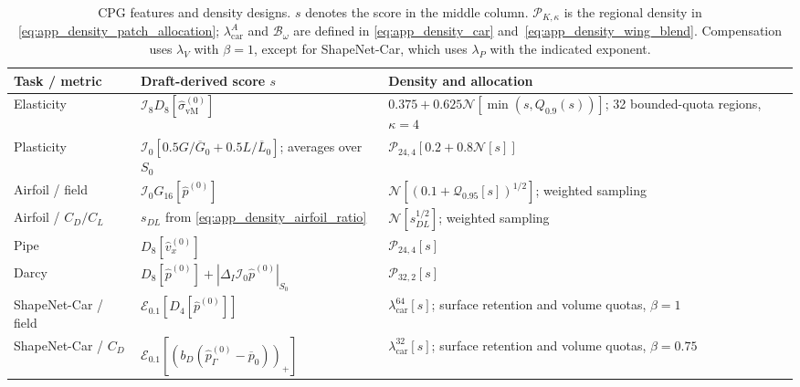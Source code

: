\begin{table}[!htbp]
    \centering
    \small
    \caption{CPG features and density designs. $s$ denotes the score in the middle column. $\mathcal{P}_{K,\kappa}$ is the regional density in \eqref{eq:app_density_patch_allocation}; $\lambda_{\mathrm{car}}^A$ and $\mathcal{B}_\omega$ are defined in \eqref{eq:app_density_car} and~\eqref{eq:app_density_wing_blend}. Compensation uses $\lambda_V$ with $\beta=1$, except for ShapeNet-Car, which uses $\lambda_P$ with the indicated exponent.}
    \label{tab:cpg_density_policies}
    \setlength{\tabcolsep}{4pt}
    \renewcommand{\arraystretch}{1.18}
    \begin{tabular}{@{}>{\raggedright\arraybackslash}p{}>{\raggedright\arraybackslash}p{}>{\raggedright\arraybackslash}p{}@{}}
        \toprule
        Task / metric & Draft-derived score $s$ & Density and allocation \\
        \midrule
        Elasticity & $\mathcal{I}_8 D_8[\widehat\sigma_{\mathrm{vM}}^{(0)}]$ & $0.375+0.625\mathcal{N}[\min(s,Q_{0.9}(s))]$; 32 bounded-quota regions, $\kappa=4$ \\
        \addlinespace[3pt]
        Plasticity & $\mathcal{I}_0[0.5G/\overline G_0+0.5L/\overline L_0]$; averages over $S_0$ & $\mathcal{P}_{24,4}[0.2+0.8\mathcal{N}[s]]$ \\
        \addlinespace[3pt]
        Airfoil / field & $\mathcal{I}_0 G_{16}[\widehat p^{(0)}]$ & $\mathcal{N}[(0.1+\mathcal{Q}_{0.95}[s])^{1/2}]$; weighted sampling \\
        \addlinespace[3pt]
        Airfoil / $C_D/C_L$ & $s_{DL}$ from \eqref{eq:app_density_airfoil_ratio} & $\mathcal{N}[s_{DL}^{1/2}]$; weighted sampling \\
        \addlinespace[3pt]
        Pipe & $D_8[\widehat v_x^{(0)}]$ & $\mathcal{P}_{24,4}[s]$ \\
        \addlinespace[3pt]
        Darcy & $D_8[\widehat p^{(0)}]+|\Delta_I\mathcal{I}_0\widehat p^{(0)}|_{S_0}$ & $\mathcal{P}_{32,2}[s]$ \\
        \midrule
        ShapeNet-Car / field & $\mathcal{E}_{0.1}[D_4[\widehat p^{(0)}]]$ & $\lambda_{\mathrm{car}}^{64}[s]$; surface retention and volume quotas, $\beta=1$ \\
        \addlinespace[3pt]
        ShapeNet-Car / $C_D$ & $\mathcal{E}_{0.1}[(b_D(\widehat p_\Gamma^{(0)}-\overline p_0))_+]$ & $\lambda_{\mathrm{car}}^{32}[s]$; surface retention and volume quotas, $\beta=0.75$ \\

\end{tabular}
\end{table}
